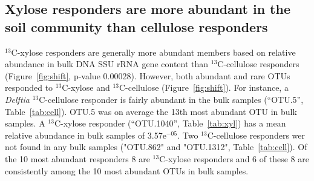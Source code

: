 \subsection{Xylose responders are more abundant in the soil community than cellulose
responders}
$^{13}$C-xylose responders are generally more abundant members based on
relative abundance in bulk DNA SSU rRNA gene content than $^{13}$C-cellulose
responders (Figure~\ref{fig:shift}, p-value 0.00028).  However, both abundant and
rare OTUs responded to $^{13}$C-xylose and $^{13}$C-cellulose
(Figure~\ref{fig:shift}). For instance, a \textit{Delftia} $^{13}$C-cellulose
responder is fairly abundant in the bulk samples (``OTU.5'',
Table~\ref{tab:cell}). OTU.5 was on average the
13th most abundant OTU in bulk samples. A $^{13}$C-xylose responder (``OTU.1040'',
Table~\ref{tab:xyl}) has a mean relative abundance in bulk samples of
3.57e$^{-05}$. Two $^{13}$C-cellulose responders wer not found
in any bulk samples ("OTU.862" and "OTU.1312", Table~\ref{tab:cell}). Of the 10 most abundant
responders 8 are $^{13}$C-xylose responders and 6 of these 8 are consistently
among the 10 most abundant OTUs in bulk samples.